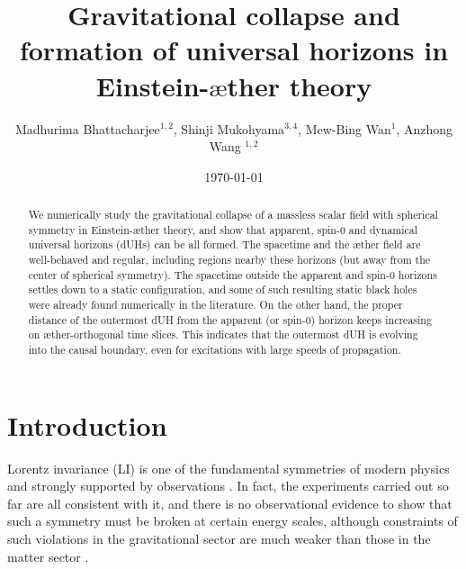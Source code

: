\documentclass[aps,preprintnumbers,twocolumn,showpacs]{revtex4-1}
\begin{document}
\title{Gravitational collapse and formation of universal horizons in Einstein-$\mbox{\ae}$ther theory}
\author{Madhurima Bhattacharjee$^{1, 2}$, Shinji Mukohyama$^{3, 4}$, Mew-Bing Wan$^{1}$, Anzhong Wang $^{1,2}$}

\date{\today}

\begin{abstract}
We numerically study the gravitational collapse of a massless scalar field with spherical symmetry in Einstein-$\mbox{\ae}$ther theory, 
and show that apparent, spin-0 and dynamical universal horizons (dUHs) can be all formed. The spacetime and the $\mbox{\ae}$ther 
field are well-behaved and regular, including regions nearby these horizons (but away from the center of spherical symmetry). The 
spacetime outside the apparent and spin-0 horizons settles down to a static configuration, and some of such resulting static black holes 
were already found numerically in the literature. On the other hand, the proper distance of the outermost dUH from the apparent (or spin-0) 
horizon keeps increasing on $\mbox{\ae}$ther-orthogonal time slices. This indicates that the outermost dUH is evolving into the causal 
boundary, even for excitations with large speeds of propagation.

\end{abstract}



\maketitle

\section{Introduction}

Lorentz invariance (LI) is one of the fundamental symmetries of modern physics and strongly supported by observations  \cite{ KR11}. In fact,  the experiments carried out so far are all consistent with it, and there is no observational evidence to show that such a symmetry must be  broken at certain energy scales, although  constraints of such violations in the gravitational sector  are much weaker than those in the matter sector \cite{Mattingly05}. 
\end{document}
